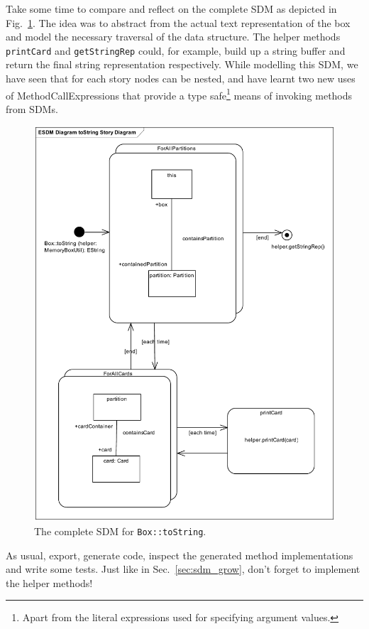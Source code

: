 Take some time to compare and reflect on the complete SDM as depicted in
Fig.~\ref{fig:sdm_tostring_5}.  The idea was to abstract from the actual text
representation of the box and model the necessary traversal of the data
structure.  The helper methods \texttt{printCard} and
\texttt{getStringRep} could, for example, build up a string buffer and return
the final string representation respectively.  While modelling this SDM, we have
seen that for each story nodes can be nested, and have learnt two new uses of
MethodCallExpressions that provide a type safe\footnote{Apart from the literal
expressions used for specifying argument values.} means of invoking methods from
SDMs.

\begin{figure}[htbp]
\begin{center}
  \includegraphics[width=\textwidth]{pics/sdmBilder/toString/sdm76}
  \caption{The complete SDM for \texttt{Box::toString}.}  
  \label{fig:sdm_tostring_5}
\end{center}
\end{figure}

As usual, export, generate code, inspect the generated method implementations
and write some tests.  Just like in Sec.~\ref{sec:sdm_grow}, don't forget to
implement the helper methods!
